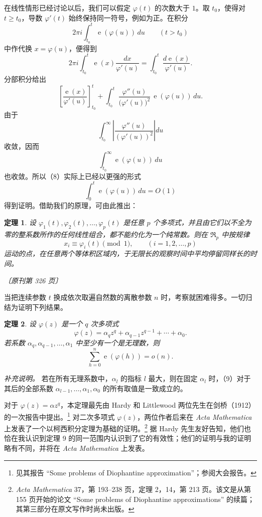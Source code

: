\documentclass[UTF8,11pt,a4paper,fontset=none]{ctexart}
\theoremstyle{weylthm}
\newtheorem{theorem}{定理}
\newcommand{\e}{\operatorname{e}}
\newcommand{\origpage}[1]{%
  \par\vspace{0.7em}\noindent\hfill{\small\itshape〔原刊第 #1 页〕}\par\vspace{0.25em}}
\begin{document}
在线性情形已经讨论以后，我们可以假定 \(\varphi(t)\) 的次数大于 \(1\)。取 \(t_0\)，使得对 \(t\geq t_0\)，导数 \(\varphi'(t)\) 始终保持同一符号，例如为正。在积分
\[
  2\pi i\int_{t_0}^{t}\e(\varphi(u))\,du
  \qquad (t>t_0)
\]
中作代换 \(x=\varphi(u)\)，便得到
\[
  2\pi i\int_{t_0}^{t}\e(x)\frac{dx}{\varphi'(u)}
  =\int_{t_0}^{t}\frac{d\e(x)}{\varphi'(u)}.
\]
分部积分给出
\[
 \left[\frac{\e(x)}{\varphi'(u)}\right]_{t_0}^{t}
 +\int_{t_0}^{t}
   \frac{\varphi''(u)}{\bigl(\varphi'(u)\bigr)^2}\,
   \e(\varphi(u))\,du.
\]
由于
\[
 \int_{t_0}^{\infty}
 \left|\frac{\varphi''(u)}{(\varphi'(u))^2}\right|du
\]
收敛，因而
\[
 \int_{t_0}^{\infty}\e(\varphi(u))\,du
\]
也收敛。所以（8）实际上已经以更强的形式
\[
 \int_0^t\e(\varphi(u))\,du=O(1)
\]
得到证明。借助我们的原理，可由此推出：

\begin{theorem}
设 \(\varphi_1(t),\varphi_2(t),\ldots,\varphi_p(t)\) 是任意 \(p\) 个多项式，并且由它们以不全为零的整系数所作的任何线性组合，都不能约化为一个纯常数。则在 \(\mathfrak R_p\) 中按规律
\[
 x_i\equiv\varphi_i(t)\pmod 1,
 \qquad (i=1,2,\ldots,p)
\]
运动的点，在任意两个等体积区域内，于无限长的观察时间中平均停留同样长的时间。
\end{theorem}

\origpage{326}

当把连续参数 \(t\) 换成依次取遍自然数的离散参数 \(n\) 时，考察就困难得多。一切归结为证明下列结果。

\begin{theorem}
设 \(\varphi(z)\) 是一个 \(q\) 次多项式
\[
 \varphi(z)=\alpha_qz^q+\alpha_{q-1}z^{q-1}+\cdots+\alpha_0.
\]
若系数 \(\alpha_q,\alpha_{q-1},\ldots,\alpha_1\) 中至少有一个是无理数，则
\begin{equation}
 \sum_{h=0}^{n}\e(\varphi(h))=o(n).
 \tag{9}
\end{equation}
\end{theorem}

\noindent\textit{补充说明。}
若在所有无理系数中，\(\alpha_l\) 的指标 \(l\) 最大，则在固定 \(\alpha_l\) 时，（9）对于其后的全部系数
\(\alpha_{l-1},\ldots,\alpha_1,\alpha_0\) 的所有取值是一致成立的。

对于 \(\varphi(z)=\alpha z^q\)，本定理最先由 Hardy 和 Littlewood 两位先生在剑桥（1912）的一次报告中提出。\footnote{见其报告 ``Some problems of Diophantine approximation''；参阅大会报告。} 对二次多项式 \(\varphi(z)\)，两位作者后来在 \emph{Acta Mathematica} 上发表了一个以柯西积分定理为基础的证明。\footnote{\emph{Acta Mathematica} 37，第 193--238 页，定理 2，14，第 213 页。该文是从第 155 页开始的论文 ``Some problems of Diophantine approximations'' 的续篇；其第三部分在原文写作时尚未出版。} 据 Hardy 先生友好告知，他们也恰在我认识到定理 9 的同一范围内认识到了它的有效性；他们的证明与我的证明略有不同，并将在 \emph{Acta Mathematica} 上发表。
\end{document}
